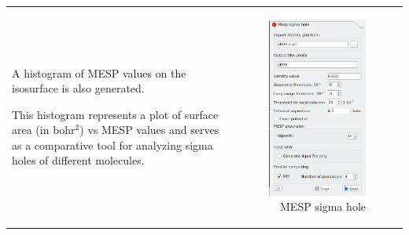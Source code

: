 \documentclass[10pt]{article}
\begin{document}
\begin{tabular}{lr}
\begin{minipage}{.6\linewidth}
A histogram\index{MESP sigma hole!histogram}
of MESP values on the isosurface is also generated.

This histogram represents a plot of surface area (in bohr$^2$) vs MESP values
and serves as a comparative tool for analyzing sigma holes
of different molecules.

\end{minipage}
&
\begin{minipage}{.4\linewidth}
\begin{figure}[H]
\begin{center}
\vspace*{-0.5mm}
\includegraphics[width=.8\linewidth]{damqt320_mesp_sg_hole.png}
\end{center}
\caption{{MESP sigma hole}\label{fig:2_7}}
\end{figure}
\end{minipage}
\end{tabular}
\end{document}
